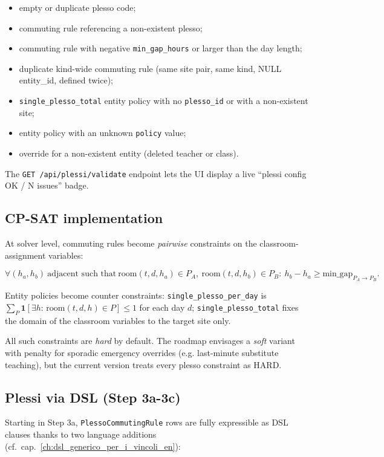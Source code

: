 \begin{itemize}
\item empty or duplicate plesso code;
\item commuting rule referencing a non-existent plesso;
\item commuting rule with negative \texttt{min\_gap\_hours}
or larger than the day length;
\item duplicate kind-wide commuting rule (same site pair,
same kind, NULL entity\_id, defined twice);
\item \texttt{single\_plesso\_total} entity policy with no
\texttt{plesso\_id} or with a non-existent site;
\item entity policy with an unknown \texttt{policy} value;
\item override for a non-existent entity (deleted teacher
or class).
\end{itemize}

The \texttt{GET /api/plessi/validate} endpoint lets the UI
display a live ``plessi config OK / N issues'' badge.

\subsection{CP-SAT implementation}

At solver level, commuting rules become \emph{pairwise}
constraints on the classroom-assignment variables:

\[
\forall (h_a, h_b)\ \text{adjacent such that}\
\text{room}(t, d, h_a) \in P_A,\
\text{room}(t, d, h_b) \in P_B:\
h_b - h_a \geq \text{min\_gap}_{P_A \to P_B}.
\]

Entity policies become counter constraints:
\texttt{single\_plesso\_per\_day} is
$\sum_{P} \mathbf{1}[\exists h:\,\text{room}(t,d,h) \in P]
\leq 1$ for each day $d$;
\texttt{single\_plesso\_total} fixes the domain of the
classroom variables to the target site only.

All such constraints are \emph{hard} by default. The
roadmap envisages a \emph{soft} variant with penalty for
sporadic emergency overrides (e.g. last-minute substitute
teaching), but the current version treats every plesso
constraint as HARD.

\subsection{Plessi via DSL (Step 3a-3c)}

Starting in Step 3a, \texttt{PlessoCommutingRule} rows are
fully expressible as DSL clauses thanks to two language
additions (cf.\ cap.~\ref{ch:dsl_generico_per_i_vincoli_en}):

